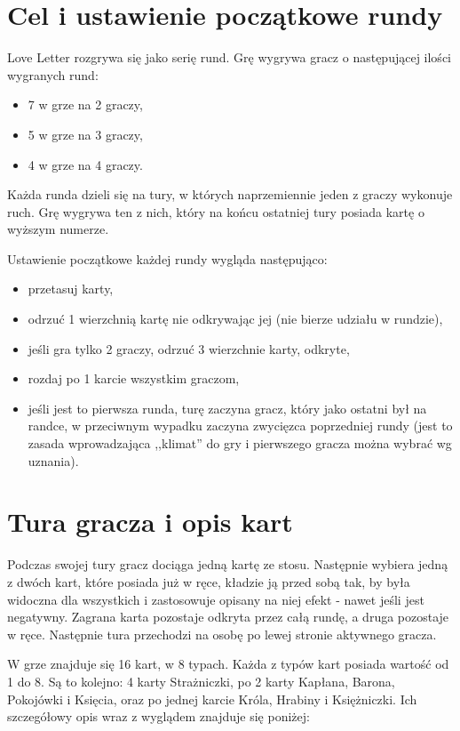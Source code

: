 \section*{Cel i ustawienie początkowe rundy}
\label{sec:celIUstawieniePoczatkowe}
Love Letter rozgrywa się jako serię rund. Grę wygrywa gracz o następującej ilości wygranych rund:
\begin{itemize}
	\item 7 w grze na 2 graczy,
	\item 5 w grze na 3 graczy,
	\item 4 w grze na 4 graczy.
\end{itemize}
Każda runda dzieli się na tury, w których naprzemiennie jeden z graczy wykonuje ruch. Grę wygrywa ten z nich, który na końcu ostatniej tury posiada kartę o wyższym numerze.

Ustawienie początkowe każdej rundy wygląda następująco:
\begin{itemize}
	\item przetasuj karty,
	\item odrzuć 1 wierzchnią kartę nie odkrywając jej (nie bierze udziału w rundzie),
	\item jeśli gra tylko 2 graczy, odrzuć 3 wierzchnie karty, odkryte,
	\item rozdaj po 1 karcie wszystkim graczom,
	\item jeśli jest to pierwsza runda, turę zaczyna gracz, który jako ostatni był na randce, w przeciwnym wypadku zaczyna zwycięzca poprzedniej rundy (jest to zasada wprowadzająca ,,klimat'' do gry i  pierwszego gracza można wybrać wg uznania).
\end{itemize}

\section*{Tura gracza i opis kart}
\label{sec:turaGracza}
Podczas swojej tury gracz dociąga jedną kartę ze stosu. Następnie wybiera jedną z dwóch kart, które posiada już w ręce, kładzie ją przed sobą tak, by była widoczna dla wszystkich i zastosowuje opisany na niej efekt - nawet jeśli jest negatywny. Zagrana karta pozostaje odkryta przez całą rundę, a druga pozostaje w ręce. Następnie tura przechodzi na osobę po lewej stronie aktywnego gracza.

W grze znajduje się 16 kart, w 8 typach. Każda z typów kart posiada wartość od 1 do 8. Są to kolejno: 4 karty Strażniczki, po 2 karty Kapłana, Barona, Pokojówki i Księcia, oraz po jednej karcie Króla, Hrabiny i Księżniczki. Ich szczegółowy opis wraz z wyglądem znajduje się poniżej:

